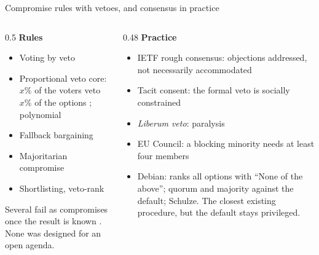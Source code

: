 \documentclass[10pt,aspectratio=169]{beamer}
\begin{document}
\begin{frame}{Compromise rules with vetoes, and consensus in practice}
  \begin{columns}[T]
    \begin{column}{0.5\textwidth}
      \textbf{Rules}
      \begin{itemize}\small
        \item Voting by veto 
        \item Proportional veto core: $x\%$ of the voters veto $x\%$ of the options
          ; polynomial 
        \item Fallback bargaining 
        \item Majoritarian compromise 
        \item Shortlisting, veto-rank 
      \end{itemize}
      \small Several fail as compromises once the result is known . \alert{None was designed for an open agenda.}
    \end{column}
    \begin{column}{0.48\textwidth}
      \textbf{Practice}
      \begin{itemize}\small
        \item IETF rough consensus: objections addressed, not necessarily accommodated 
        \item Tacit consent: the formal veto is socially constrained 
        \item \emph{Liberum veto}: paralysis 
        \item EU Council: a blocking minority needs at least four members 
        \item \alert{Debian}: ranks all options with ``None of the above''; quorum and majority against the
          default; Schulze. The closest existing procedure, but the default stays privileged.
      \end{itemize}
    \end{column}
  \end{columns}
\end{frame}
\end{document}
